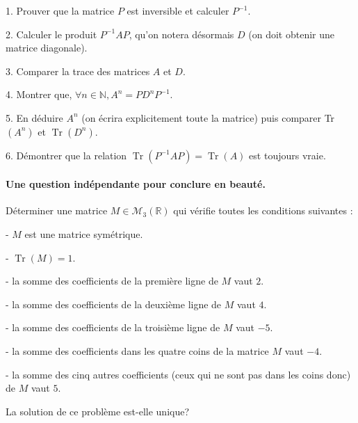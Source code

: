 \documentclass[a4paper, 11pt,reqno]{article}
\begin{document}
\begin{exercice}
1. Prouver que la matrice $P$ est inversible et calculer $P^{-1}$.

2. Calculer le produit $P^{-1} A P$, qu'on notera désormais $D$ (on doit obtenir une matrice diagonale).

3. Comparer la trace des matrices $A$ et $D$.

4. Montrer que, $\forall n \in \mathbb{N}, A^{n}=P D^{n} P^{-1}$.

5. En déduire $A^{n}$ (on écrira explicitement toute la matrice) puis comparer Tr $\left(A^{n}\right)$ et $\operatorname{Tr}\left(D^{n}\right)$.

6. Démontrer que la relation $\operatorname{Tr}\left(P^{-1} A P\right)=\operatorname{Tr}(A)$ est toujours vraie.

\paragraph{Une question indépendante pour conclure en beauté.}

Déterminer une matrice $M \in \mathcal{M}_{3}(\mathbb{R})$ qui vérifie toutes les conditions suivantes :

- $M$ est une matrice symétrique.

- $\operatorname{Tr}(M)=1 .$

- la somme des coefficients de la première ligne de $M$ vaut $2 .$

- la somme des coefficients de la deuxième ligne de $M$ vaut $4 .$

- la somme des coefficients de la troisième ligne de $M$ vaut $-5 .$

- la somme des coefficients dans les quatre coins de la matrice $M$ vaut $-4$.

- la somme des cinq autres coefficients (ceux qui ne sont pas dans les coins donc) de $M$ vaut $5 .$

La solution de ce problème est-elle unique?
\end{exercice}
\end{document}
